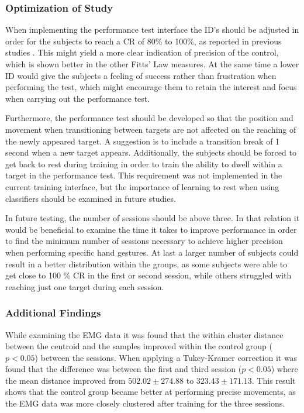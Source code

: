\subsubsection{Optimization of Study}
When implementing the performance test interface the ID's should be adjusted in order for the subjects to reach a CR of 80\% to 100\%, as reported in previous studies \cite{Scheme2013,Scheme2013a}. This might yield a more clear indication of precision of the control, which is shown better in the other Fitts' Law measures. At the same time a lower ID would give the subjects a feeling of success rather than frustration when performing the test, which might encourage them to retain the interest and focus when carrying out the performance test.

Furthermore, the performance test should be developed so that the position and movement when transitioning between targets are not affected on the reaching of the newly appeared target. A suggestion is to include a transition break of 1 second when a new target appears. Additionally, the subjects should be forced to get back to rest during training in order to train the ability to dwell within a target in the performance test. This requirement was not implemented in the current training interface, but the importance of learning to rest when using classifiers should be examined in future studies.

In future testing, the number of sessions should be above three. In that relation it would be beneficial to examine the time it takes to improve performance in order to find the minimum number of sessions necessary to achieve higher precision when performing specific hand gestures. 
At last a larger number of subjects could result in a better distribution within the groups, as some subjects were able to get close to 100 \% CR in the first or second session, while others struggled with reaching just one target during each session. 

\subsubsection{Additional Findings}
While examining the EMG data it was found that the within cluster distance between the centroid and the samples improved within the control group ($p < 0.05$) between the sessions. When applying a Tukey-Kramer correction it was found that the difference was between the first and third session ($p < 0.05$) where the mean distance improved from $502.02 \pm 274.88$ to $323.43 \pm 171.13$. This result shows that the control group became better at performing precise movements, as the EMG data was more closely clustered after training for the three sessions. 

